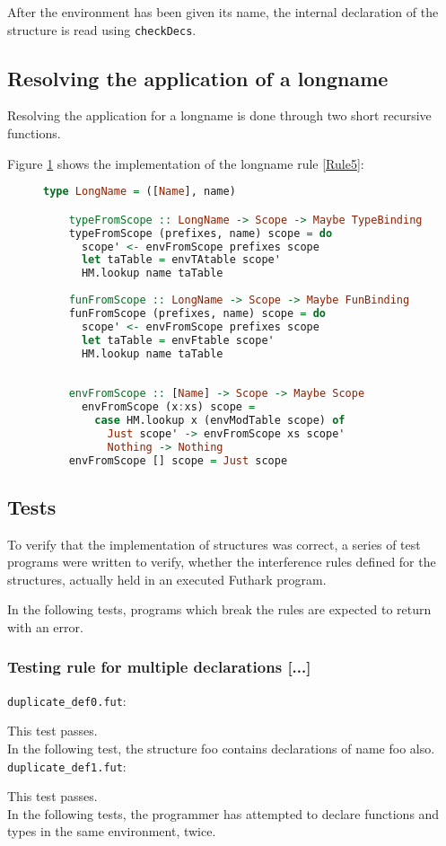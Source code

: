 After the environment has been given its name, the internal declaration of the
structure is read using \texttt{checkDecs}.

\subsection{Resolving the application of a longname}
Resolving the application for a longname is done through two short recursive
functions.

Figure \ref{resolvelongname} shows the implementation of the longname rule
\ref{Rule5}:
\begin{figure}\label{resolvelongname}
  \begin{lstlisting}[language=Haskell]
    type LongName = ([Name], name)

    typeFromScope :: LongName -> Scope -> Maybe TypeBinding
    typeFromScope (prefixes, name) scope = do
      scope' <- envFromScope prefixes scope
      let taTable = envTAtable scope'
      HM.lookup name taTable
    
    funFromScope :: LongName -> Scope -> Maybe FunBinding
    funFromScope (prefixes, name) scope = do
      scope' <- envFromScope prefixes scope
      let taTable = envFtable scope'
      HM.lookup name taTable
    
    
    envFromScope :: [Name] -> Scope -> Maybe Scope
      envFromScope (x:xs) scope =
        case HM.lookup x (envModTable scope) of
          Just scope' -> envFromScope xs scope'
          Nothing -> Nothing
    envFromScope [] scope = Just scope
\end{lstlisting}
\end{figure}

\subsection{Tests}
\label{subsec:structuretests}
To verify that the implementation of structures was correct, a series of test
programs were written to verify, whether the interference rules defined for the
structures, actually held in an executed Futhark program.

In the following tests, programs which break the rules are expected to return
with an error.

\subsubsection{Testing rule for multiple declarations [...]}
\texttt{duplicate_def0.fut}:

This test passes.
\\
In the following test, the structure foo contains declarations of name foo also.
\texttt{duplicate_def1.fut}:

This test passes.
\\
In the following tests, the programmer has attempted to declare functions and
types in the same environment, twice.

